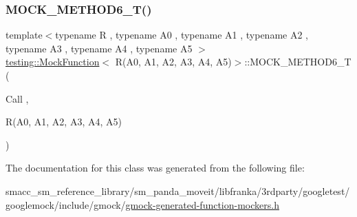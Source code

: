 \mbox{\label{classtesting_1_1MockFunction_3_01R_07A0_00_01A1_00_01A2_00_01A3_00_01A4_00_01A5_08_4_ae66d20991ea3ab7d2b817c54df80653e}} 
\subsubsection{\texorpdfstring{M\+O\+C\+K\+\_\+\+M\+E\+T\+H\+O\+D6\+\_\+\+T()}{MOCK\_METHOD6\_T()}}
{\footnotesize\ttfamily template$<$typename R , typename A0 , typename A1 , typename A2 , typename A3 , typename A4 , typename A5 $>$ \\
\hyperlink{classtesting_1_1MockFunction}{testing\+::\+Mock\+Function}$<$ R(A0, A1, A2, A3, A4, A5)$>$\+::M\+O\+C\+K\+\_\+\+M\+E\+T\+H\+O\+D6\+\_\+T (\begin{DoxyParamCaption}\item[{Call}]{,  }\item[{R(A0, A1, A2, A3, A4, A5)}]{ }\end{DoxyParamCaption})}



The documentation for this class was generated from the following file\+:\begin{DoxyCompactItemize}
\item 
smacc\+\_\+sm\+\_\+reference\+\_\+library/sm\+\_\+panda\+\_\+moveit/libfranka/3rdparty/googletest/googlemock/include/gmock/\hyperlink{gmock-generated-function-mockers_8h}{gmock-\/generated-\/function-\/mockers.\+h}\end{DoxyCompactItemize}
